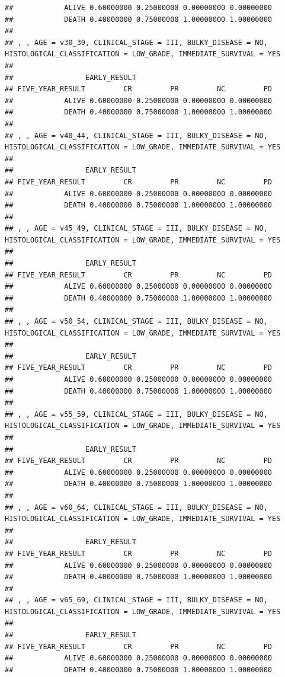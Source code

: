 \documentclass[]{article}
\begin{document}
\begin{verbatim}
##            ALIVE 0.60000000 0.25000000 0.00000000 0.00000000
##            DEATH 0.40000000 0.75000000 1.00000000 1.00000000
## 
## , , AGE = v30_39, CLINICAL_STAGE = III, BULKY_DISEASE = NO, HISTOLOGICAL_CLASSIFICATION = LOW_GRADE, IMMEDIATE_SURVIVAL = YES
## 
##                 EARLY_RESULT
## FIVE_YEAR_RESULT         CR         PR         NC         PD
##            ALIVE 0.60000000 0.25000000 0.00000000 0.00000000
##            DEATH 0.40000000 0.75000000 1.00000000 1.00000000
## 
## , , AGE = v40_44, CLINICAL_STAGE = III, BULKY_DISEASE = NO, HISTOLOGICAL_CLASSIFICATION = LOW_GRADE, IMMEDIATE_SURVIVAL = YES
## 
##                 EARLY_RESULT
## FIVE_YEAR_RESULT         CR         PR         NC         PD
##            ALIVE 0.60000000 0.25000000 0.00000000 0.00000000
##            DEATH 0.40000000 0.75000000 1.00000000 1.00000000
## 
## , , AGE = v45_49, CLINICAL_STAGE = III, BULKY_DISEASE = NO, HISTOLOGICAL_CLASSIFICATION = LOW_GRADE, IMMEDIATE_SURVIVAL = YES
## 
##                 EARLY_RESULT
## FIVE_YEAR_RESULT         CR         PR         NC         PD
##            ALIVE 0.60000000 0.25000000 0.00000000 0.00000000
##            DEATH 0.40000000 0.75000000 1.00000000 1.00000000
## 
## , , AGE = v50_54, CLINICAL_STAGE = III, BULKY_DISEASE = NO, HISTOLOGICAL_CLASSIFICATION = LOW_GRADE, IMMEDIATE_SURVIVAL = YES
## 
##                 EARLY_RESULT
## FIVE_YEAR_RESULT         CR         PR         NC         PD
##            ALIVE 0.60000000 0.25000000 0.00000000 0.00000000
##            DEATH 0.40000000 0.75000000 1.00000000 1.00000000
## 
## , , AGE = v55_59, CLINICAL_STAGE = III, BULKY_DISEASE = NO, HISTOLOGICAL_CLASSIFICATION = LOW_GRADE, IMMEDIATE_SURVIVAL = YES
## 
##                 EARLY_RESULT
## FIVE_YEAR_RESULT         CR         PR         NC         PD
##            ALIVE 0.60000000 0.25000000 0.00000000 0.00000000
##            DEATH 0.40000000 0.75000000 1.00000000 1.00000000
## 
## , , AGE = v60_64, CLINICAL_STAGE = III, BULKY_DISEASE = NO, HISTOLOGICAL_CLASSIFICATION = LOW_GRADE, IMMEDIATE_SURVIVAL = YES
## 
##                 EARLY_RESULT
## FIVE_YEAR_RESULT         CR         PR         NC         PD
##            ALIVE 0.60000000 0.25000000 0.00000000 0.00000000
##            DEATH 0.40000000 0.75000000 1.00000000 1.00000000
## 
## , , AGE = v65_69, CLINICAL_STAGE = III, BULKY_DISEASE = NO, HISTOLOGICAL_CLASSIFICATION = LOW_GRADE, IMMEDIATE_SURVIVAL = YES
## 
##                 EARLY_RESULT
## FIVE_YEAR_RESULT         CR         PR         NC         PD
##            ALIVE 0.60000000 0.25000000 0.00000000 0.00000000
##            DEATH 0.40000000 0.75000000 1.00000000 1.00000000

\end{verbatim}
\end{document}
